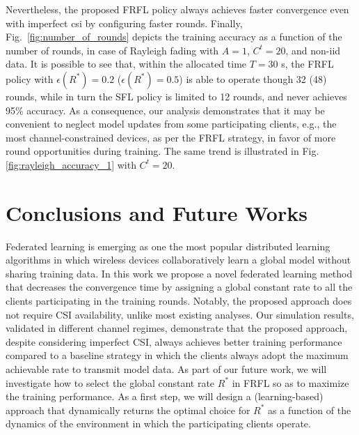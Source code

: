 \documentclass[10pt, conference, letterpaper]{IEEEtran}
\begin{document}
	Nevertheless, the proposed FRFL policy always achieves faster convergence even with imperfect \gls{csi} by configuring faster rounds. Finally, Fig.~\ref{fig:number_of_rounds} depicts the training accuracy as a function of the number of rounds, in case of Rayleigh fading with $A=1$, $C^t=20$, and non-iid data. It is possible to see that, within the allocated time $T=30$ s, the FRFL policy with $\epsilon(R^*)=0.2$ ($\epsilon(R^*)=0.5$) is able to operate though 32 (48) rounds, while in turn the SFL policy is limited to 12 rounds, and never achieves 95\% accuracy. As a consequence, our analysis demonstrates that it may be convenient to neglect model updates from some participating clients, e.g., the most channel-constrained devices, as per the FRFL strategy, in favor of more round opportunities during training.
	The same trend is illustrated in Fig. \ref{fig:rayleigh_accuracy_1} with $C^t=20$.
	
	
	\section{Conclusions and Future Works} 
	\label{sec:conclusions_and_future_works}
	Federated learning is emerging as one the most popular distributed learning algorithms in which wireless devices collaboratively learn a global model without sharing training data.
	In this work we propose a novel federated learning method that decreases the convergence time by assigning a global constant rate to all the clients participating in the training rounds. Notably, the proposed approach does not require CSI availability, unlike most existing analyses.
	Our simulation results, validated in different channel regimes, demonstrate that the proposed approach, despite   considering imperfect CSI, always achieves better training performance compared to a baseline strategy in which the clients always adopt the maximum achievable rate to transmit model data. As part of our future work, we will investigate how to select the global constant rate $R^*$ in FRFL so as to maximize the training performance. As a first step, we will design a (learning-based) approach that dynamically returns the optimal choice for $R^*$ as a function of the dynamics of the environment in which the participating clients operate.
	
	
	
	
	
\end{document}

